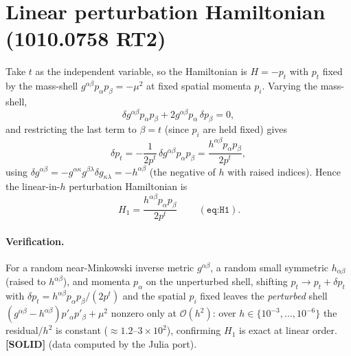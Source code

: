\documentclass{article}
\begin{document}
\section*{Linear perturbation Hamiltonian (1010.0758 RT2)}

Take $t$ as the independent variable, so the Hamiltonian is $H=-p_t$ with $p_t$ fixed by the mass-shell
$g^{\alpha\beta}p_\alpha p_\beta=-\mu^2$ at fixed spatial momenta $p_i$. Varying the mass-shell,
\begin{equation}
  \delta g^{\alpha\beta}p_\alpha p_\beta + 2g^{\alpha\beta}p_\alpha\,\delta p_\beta = 0 ,
\end{equation}
and restricting the last term to $\beta=t$ (since $p_i$ are held fixed) gives
\begin{equation}
  \delta p_t = -\frac{1}{2p^t}\,\delta g^{\alpha\beta}p_\alpha p_\beta
             = \frac{h^{\alpha\beta}p_\alpha p_\beta}{2p^t},
\end{equation}
using $\delta g^{\alpha\beta}=-g^{\alpha\kappa}g^{\beta\lambda}\delta g_{\kappa\lambda}=-h^{\alpha\beta}$
(the negative of $h$ with raised indices). Hence the linear-in-$h$ perturbation Hamiltonian is
\begin{equation}
  \boxed{\,H_1 = \frac{h^{\alpha\beta}p_\alpha p_\beta}{2p^t}\,}\qquad(\texttt{eq:H1}).
\end{equation}

\paragraph{Verification.} For a random near-Minkowski inverse metric $g^{\alpha\beta}$, a random small
symmetric $h_{\alpha\beta}$ (raised to $h^{\alpha\beta}$), and momenta $p_\alpha$ on the unperturbed shell,
shifting $p_t\to p_t+\delta p_t$ with $\delta p_t=h^{\alpha\beta}p_\alpha p_\beta/(2p^t)$ and the spatial
$p_i$ fixed leaves the \emph{perturbed} shell $(g^{\alpha\beta}-h^{\alpha\beta})p'_\alpha p'_\beta+\mu^2$
nonzero only at $\mathcal{O}(h^2)$: over $h\in\{10^{-3},\dots,10^{-6}\}$ the residual$/h^2$ is constant
($\approx1.2\text{–}3\times10^2$), confirming $H_1$ is exact at linear order. \textbf{[SOLID]} (data computed
by the Julia port).
\end{document}
